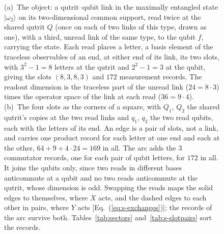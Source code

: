 \begin{figure}[t]
\caption{(a)~The object: a qutrit--qubit link in the maximally entangled state $|\omega_{2}\rangle$ on its two-dimensional common support, read twice at the shared qutrit $Q$ (once on each of two links of this type, drawn as one), with a third, unread link of the same type, to the qubit $f$, carrying the state. Each read places a letter, a basis element of the traceless observables of an end, at either end of its link, its two slots, with $3^{2}-1=8$ letters at the qutrit and $2^{2}-1=3$ at the qubit, giving the slots $(8,3,8,3)$ and $172$ measurement records. The readout dimension is the traceless part of the unread link ($24 = 8\cdot 3$) times the operator space of the link at each read ($36 = 9\cdot 4$). (b)~The four slots as the corners of a square, with $Q_{1}$, $Q_{2}$ the shared qutrit's copies at the two read links and $q_{1}$, $q_{2}$ the two read qubits, each with the letters of its end. An edge is a pair of slots, not a link, and carries one product record for each letter at one end and each at the other, $64+9+4\cdot 24=169$ in all. The arc adds the $3$ commutator records, one for each pair of qubit letters, for $172$ in all. It joins the qubits only, since two reads in different bases anticommute at a qubit and no two reads anticommute at the qutrit, whose dimension is odd. Swapping the reads maps the solid edges to themselves, where $X$ acts, and the dashed edges to each other in pairs, where $Y$ acts [Eq.~(\ref{eq:s-exchanges})]; the records of the arc survive both. Tables~\ref{tab:sectors} and~\ref{tab:s-slotpairs} sort the records.}
\label{fig:link}
\end{figure}
